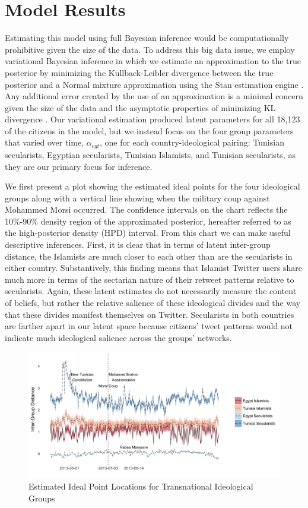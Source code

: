 \documentclass[12pt]{article}
\begin{document}
\section*{Model Results}

Estimating this model using full Bayesian inference would be computationally prohibitive given the size of the data. To address this big data issue, we employ variational Bayesian inference in which we estimate an approximation to the true posterior by minimizing the Kullback-Leibler divergence between the true posterior and a Normal mixture approximation using the Stan estimation engine \parencite{NIPS2015_5758}. Any additional error created by the use of an approximation is a minimal concern given the size of the data and the asymptotic properties of minimizing KL divergence \parencite{grimmer2011,NIPS2015_5758}. Our variational estimation produced latent parameters for all 18,123 of the citizens in the model, but we instead focus on the four group parameters that varied over time, $\alpha_{cgt}$, one for each country-ideological pairing: Tunisian secularists, Egyptian secularists, Tunisian Islamists, and Tunisian secularists, as they are our primary focus for inference.

We first present a plot showing the estimated ideal points for the four ideological groups along with a vertical line showing when the military coup against Mohammed Morsi occurred. The confidence intervals on the chart reflects the 10\%-90\% density region of the approximated posterior, hereafter referred to as the high-posterior density (HPD) interval. From this chart we can make useful descriptive inferences. First, it is clear that in terms of latent inter-group distance, the Islamists are much closer to each other than are the secularists in either country. Substantively, this finding means that Islamist Twitter users share much more in terms of the sectarian nature of their retweet patterns relative to secularists. Again, these latent estimates do not necessarily measure the content of beliefs, but rather the relative salience of these ideological divides and the way that these divides manifest themselves on Twitter. Secularists in both countries are farther apart in our latent space because citizens' tweet patterns would not indicate much ideological salience across the groups' networks. 
 \begin{figure}[!h]
 	\centering
	\caption{Estimated Ideal Point Locations for Transnational Ideological Groups}\label{arab_id_facet}
	\centering
	\includegraphics[width=.9\linewidth]{arab_ideology}
\end{figure}
\end{document}
